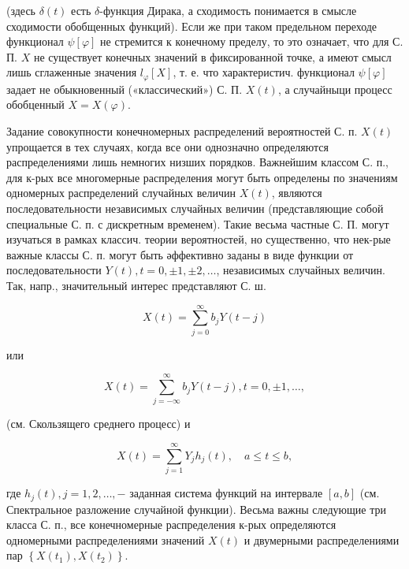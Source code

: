 \documentclass[10pt]{article}
\begin{document}
(здесь $\delta(t)$ есть $\delta$-функция Дирака, а сходимость понимается в смысле сходимости обобщенных функций). Если же при таком предельном переходе функционал $\psi[\varphi]$ не стремится к конечному пределу, то это означает, что для С. П. $X$ не существует конечных значений в фиксированной точке, а имеют смысл лишь сглаженные значения $l_{\varphi}[X]$, т. е. что характеристич. функционал $\psi[\varphi]$ задает не обыкновенный («классический») С. П. $X(t)$, а случайныци процесс обобценный $X=X(\varphi)$.



Задание совокупности конечномерных распределений вероятностей С. п. $X(t)$ упрощается в тех случаях, когда все они однозначно определяются распределениями лишь немногих низших порядков. Важнейшим классом С. п., для к-рых все многомерные распределения могут быть определены по значениям одномерных распределений случайных величин $X(t)$, являются последовательности независимых случайных величин (представляющие собой специальные С. п. с дискретным временем). Такие весьма частные С. П. могут изучаться в рамках классич. теории вероятностей, но существенно, что нек-рые важные классы С. п. могут быть әффективно заданы в виде функции от последовательности $Y(t), t=0, \pm 1, \pm 2, \ldots$, независимых случайных величин. Так, напр., значительный интерес представляют С. ш.



\[

X(t)=\sum_{j=0}^{\infty} b_{j} Y(t-j)

\]



или



\[

X(t)=\sum_{j=-\infty}^{\infty} b_{j} Y(t-j), t=0, \pm 1, \ldots,

\]



(см. Скользящего среднего процесс) и



\[

X(t)=\sum_{j=1}^{\infty} Y_{j} h_{j}(t), \quad a \leqslant t \leqslant b,

\]



где $h_{j}(t), j=1,2, \ldots,-$ заданная система функций на интервале $[a, b]$ (см. Спектральное разложение случайной функции). Весьма важны следующие три класса С. п., все конечномерные распределения к-рых определяются одномерными распределениями значений $X(t)$ и двумерными распределениями пар $\left\{X\left(t_{1}\right), X\left(t_{2}\right)\right\}$.
\end{document}
